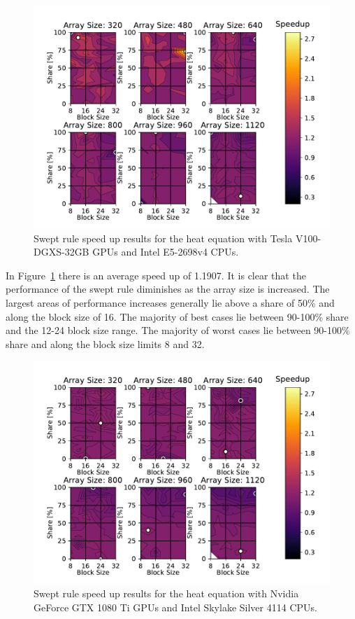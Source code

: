 \documentclass[review]{elsarticle}
\def\oldCPU{s}
\def\oldGPU{s}
\def\newCPU{s}
\def\newGPU{s}
\def\oldCPU{Intel Skylake Silver 4114} %
\def\oldGPU{Nvidia GeForce GTX 1080 Ti}
\def\newCPU{Intel E5-2698v4} %
\def\newGPU{Tesla V100-DGXS-32GB}
\begin{document}
\begin{figure}[htb!]
    \centering
    \includegraphics[scale=0.7]{figs/speedUpheatNew.pdf}
    \caption{Swept rule speed up results for the heat equation with \newGPU{} GPUs and \newCPU{} CPUs.}
    \label{fig:newSpeedupHeat}
\end{figure}

In Figure~\ref{fig:newSpeedupHeat} there is an average speed up of 1.1907. It is clear that the performance of the swept rule diminishes as the array size is increased. The largest areas of performance increases generally lie above a share of 50\% and along the block size of 16. The majority of best cases lie between 90-100\% share and the 12-24 block size range. The majority of worst cases lie between 90-100\% share and along the block size limits 8 and 32.

\begin{figure}[htb!]
    \centering
    \includegraphics[scale=0.7]{figs/speedUpheatOld.pdf}
    \caption{Swept rule speed up results for the heat equation with \oldGPU{} GPUs and \oldCPU{} CPUs.}
    \label{fig:oldSpeedupHeat}
\end{figure}
\end{document}
